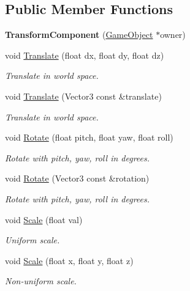 \subsection*{Public Member Functions}
\begin{DoxyCompactItemize}
\item 
\mbox{\label{classTransformComponent_a7502ad57bb3aabeeb5860c7fae4b8a20}} 
{\bfseries Transform\+Component} (\hyperlink{classGameObject}{Game\+Object} $\ast$owner)
\item 
void \hyperlink{classTransformComponent_a7c7e1222f008772fb4998c2b93e3c0f7}{Translate} (float dx, float dy, float dz)
\begin{DoxyCompactList}\small\item\em Translate in world space. \end{DoxyCompactList}\item 
void \hyperlink{classTransformComponent_a2ec6de20875d08069e2c4f89e9ac9cca}{Translate} (Vector3 const \&translate)
\begin{DoxyCompactList}\small\item\em Translate in world space. \end{DoxyCompactList}\item 
void \hyperlink{classTransformComponent_a305b12762fc44d18713ebe31664c92f2}{Rotate} (float pitch, float yaw, float roll)
\begin{DoxyCompactList}\small\item\em Rotate with pitch, yaw, roll in degrees. \end{DoxyCompactList}\item 
void \hyperlink{classTransformComponent_a0328d56a74c66c77c2348e233268f53f}{Rotate} (Vector3 const \&rotation)
\begin{DoxyCompactList}\small\item\em Rotate with pitch, yaw, roll in degrees. \end{DoxyCompactList}\item 
void \hyperlink{classTransformComponent_a82b208965988bd45e7d8b40d9ce27e1c}{Scale} (float val)
\begin{DoxyCompactList}\small\item\em Uniform scale. \end{DoxyCompactList}\item 
void \hyperlink{classTransformComponent_a61ef441f9449ba0b34ae73c71da30852}{Scale} (float x, float y, float z)
\begin{DoxyCompactList}\small\item\em Non-\/uniform scale. \end{DoxyCompactList}\item 

\end{DoxyCompactItemize}
